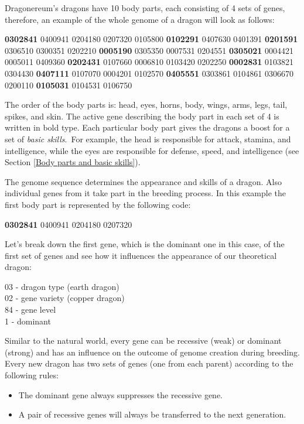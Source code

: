 \documentclass[12pt]{article}
\begin{document}
Dragonereum’s dragons have 10 body parts, each consisting of 4 sets of genes, therefore, an example of the whole genome of a dragon will look as follows:\par

\textbf{0302841} 0400941 0204180 0207320 0105800 \textbf{0102291} 0407630 0401391 \textbf{0201591} 0306510 0300351 0202210 \textbf{0005190} 0305350 0007531 0204551 \textbf{0305021} 0004421 0005011 0409360 \textbf{0202431} 0107660 0006810 0103420 0202250 \textbf{0002831} 0103821 0304430 \textbf{0407111} 0107070 0004201 0102570 \textbf{0405551} 0303861 0104861 0306670 0200110 \textbf{0105031} 0104531 0106750\par

The order of the body parts is: head, eyes, horns, body, wings, arms, legs, tail, spikes, and skin. The active gene describing the body part in each set of 4 is written in bold type. Each particular body part gives the dragons a boost for a set of\textit{ basic skills}.\ For example, the head is responsible for attack, stamina, and intelligence, while the eyes are responsible for defense, speed, and intelligence (see Section \ref{Body parts and basic skills}).\par

The genome sequence determines the appearance and skills of a dragon. Also individual genes from it take part in the breeding process. In this example the first body part is represented by the following code:\par

\textbf{0302841} 0400941 0204180 0207320\par


\vspace{\baselineskip}

\begin{samepage}
Let's break down the first gene, which is the dominant one in this case, of the first set of genes and see how it influences the appearance of our theoretical dragon: 

03 - dragon type (earth dragon) \\
02 - gene variety (copper dragon) \\
84 - gene level \\
1 - dominant 
\end{samepage}

Similar to the natural world, every gene can be recessive (weak) or dominant (strong) and has an influence on the outcome of genome creation during breeding. Every new dragon has two sets of genes (one from each parent) according to the following rules:
\begin{itemize}
	\item The dominant gene always suppresses the recessive gene.
	\item A pair of recessive genes will always be transferred to the next generation.
\end{itemize}
\end{document}
